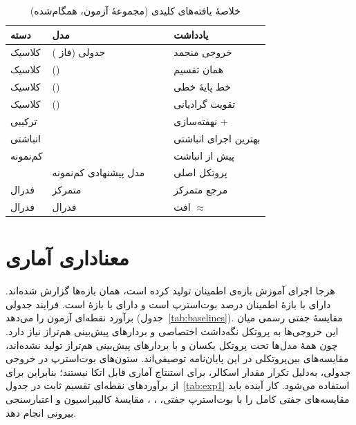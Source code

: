 \begin{table}[htbp]
\centering
\caption{خلاصۀ یافته‌های کلیدی (مجموعۀ آزمون، همگام‌شده)}
\footnotesize
\setlength{\tabcolsep}{1.8pt}
\renewcommand{\arraystretch}{1.12}
\begin{tabularx}{\linewidth}{@{}R{1.35cm}Y C{1.25cm}C{1.15cm}R{3.05cm}@{}}
\toprule
دسته & مدل &  &  & یادداشت \\
\midrule
کلاسیک & جدولی  (فاز ) &\textbf{}&& خروجی منجمد \\
کلاسیک &  () &&& همان تقسیم  \\
کلاسیک &  () &&& خط پایۀ خطی \\
کلاسیک &  () &&& تقویت گرادیانی \\
\midrule
ترکیبی &  &&& نهفته‌سازی +  \\
انباشتی &  &&& بهترین اجرای انباشتی \\
کم‌نمونه &  &&& پیش از انباشت \\
 & مدل پیشنهادی کم‌نمونه &&& پروتکل اصلی  \\
\midrule
فدرال & متمرکز & && مرجع متمرکز \\
فدرال & فدرال & && افت $\approx$  \\
\bottomrule
\end{tabularx}
\label{tab:summary_key_results}
\end{table}

\section{معناداری آماری}

هرجا اجرای آموزش بازه‌ی اطمینان تولید کرده است، همان بازه‌ها گزارش شده‌اند.  دارای  \textbf{} با بازۀ اطمینان  درصد بوت‌استرپ \textbf{\cnum{[0.699, 0.797]}} است و  دارای   با بازۀ \cnum{[0.612, 0.726]} است. فرایند جدولی  برآورد نقطه‌ای  آزمون \textbf{} را می‌دهد (جدول~\ref{tab:baselines}). مقایسۀ جفتی رسمی میان این خروجی‌ها به پروتکل نگه‌داشت اختصاصی و بردارهای پیش‌بینی هم‌تراز نیاز دارد. چون همۀ مدل‌ها تحت پروتکل یکسان و با بردارهای پیش‌بینی هم‌تراز تولید نشده‌اند، مقایسه‌های بین‌پروتکلی در این پایان‌نامه توصیفی‌اند. ستون‌های بوت‌استرپ  در خروجی جدولی، به‌دلیل تکرار مقدار اسکالر، برای استنتاج آماری قابل اتکا نیستند؛ بنابراین برای  از برآوردهای نقطه‌ای تقسیم ثابت در جدول~\ref{tab:exp1} استفاده می‌شود. کار آینده باید مقایسه‌های جفتی کامل را با بوت‌استرپ جفتی، ، ، مقایسۀ کالیبراسیون و اعتبارسنجی بیرونی انجام دهد.

